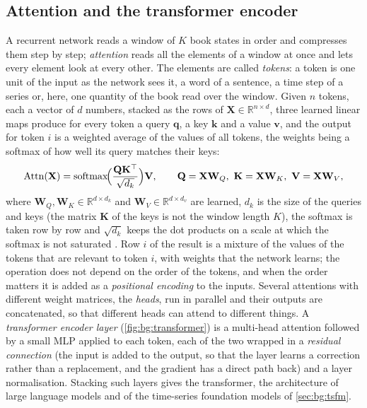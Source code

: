 \subsection{Attention and the transformer encoder}
\label{sec:bg:attention}

A recurrent network reads a window of $K$ book states in order and compresses them step by
step; \emph{attention} reads all the elements of a window at once and lets every element
look at every other.  The elements are called \emph{tokens}: a token is one unit of the
input as the network sees it, a word of a sentence, a time step of a series or, here, one
quantity of the book read over the window.  Given $n$ tokens, each a vector of $d$ numbers,
stacked as the rows of $\mathbf{X} \in \mathbb{R}^{n \times d}$, three learned linear
maps produce for every token a query
$\mathbf{q}$, a key $\mathbf{k}$ and a value $\mathbf{v}$, and the output for token $i$ is a
weighted average of the values of all tokens, the weights being a softmax of how well its
query matches their keys:
\begin{equation}
  \operatorname{Attn}(\mathbf{X}) = \operatorname{softmax}\!\Bigl(\frac{\mathbf{Q}\mathbf{K}^{\top}}{\sqrt{d_k}}\Bigr)\mathbf{V},
  \qquad
  \mathbf{Q} = \mathbf{X}\mathbf{W}_Q,\ \mathbf{K} = \mathbf{X}\mathbf{W}_K,\ \mathbf{V} = \mathbf{X}\mathbf{W}_V,
  \label{eq:attention}
\end{equation}
where $\mathbf{W}_Q, \mathbf{W}_K \in \mathbb{R}^{d \times d_k}$ and $\mathbf{W}_V \in
\mathbb{R}^{d \times d_v}$ are learned, $d_k$ is the size of the queries and keys (the matrix
$\mathbf{K}$ of the keys is not the window length $K$), the softmax is taken row by row and
$\sqrt{d_k}$ keeps the dot products on a scale at which the softmax is not saturated
\cite{vaswani2017attention}.  Row $i$ of the
result is a mixture of the values of the tokens that are relevant to token $i$, with
weights that the network learns; the operation does not depend on the order of the tokens,
and when the order matters it is added as a \emph{positional encoding} to the inputs.
Several attentions with different weight matrices, the \emph{heads}, run in parallel and
their outputs are concatenated, so that different heads can attend to different things.  A
\emph{transformer encoder layer} (\cref{fig:bg:transformer}) is a multi-head attention
followed by a small MLP applied to each token, each of the two wrapped in a \emph{residual
connection} (the input is added to the output, so that the layer learns a correction
rather than a replacement, and the gradient has a direct path back) and a layer
normalisation.  Stacking such layers gives the transformer, the architecture of large
language models and of the time-series foundation models of \cref{sec:bg:tsfm}.

